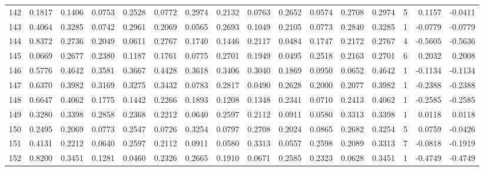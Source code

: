 \begin{tabular}{lrrrrrrrrrrrrrrr}
142 &      0.1817 &  0.1406 &  0.0753 &  0.2528 &  0.0772 &  0.2974 &  0.2132 &  0.0763 &  0.2652 &  0.0574 &   0.2708 &     0.2974 &      5 &                    0.1157 &                    -0.0411 \\
143 &      0.4064 &  0.3285 &  0.0742 &  0.2961 &  0.2069 &  0.0565 &  0.2693 &  0.1049 &  0.2105 &  0.0773 &   0.2840 &     0.3285 &      1 &                   -0.0779 &                    -0.0779 \\
144 &      0.8372 &  0.2736 &  0.2049 &  0.0611 &  0.2767 &  0.1740 &  0.1446 &  0.2117 &  0.0484 &  0.1747 &   0.2172 &     0.2767 &      4 &                   -0.5605 &                    -0.5636 \\
145 &      0.0669 &  0.2677 &  0.2380 &  0.1187 &  0.1761 &  0.0775 &  0.2701 &  0.1949 &  0.0495 &  0.2518 &   0.2163 &     0.2701 &      6 &                    0.2032 &                     0.2008 \\
146 &      0.5776 &  0.4642 &  0.3581 &  0.3667 &  0.4428 &  0.3618 &  0.3406 &  0.3040 &  0.1869 &  0.0950 &   0.0652 &     0.4642 &      1 &                   -0.1134 &                    -0.1134 \\
147 &      0.6370 &  0.3982 &  0.3169 &  0.3275 &  0.3432 &  0.0783 &  0.2817 &  0.0490 &  0.2628 &  0.2000 &   0.2077 &     0.3982 &      1 &                   -0.2388 &                    -0.2388 \\
148 &      0.6647 &  0.4062 &  0.1775 &  0.1442 &  0.2266 &  0.1893 &  0.1208 &  0.1348 &  0.2341 &  0.0710 &   0.2413 &     0.4062 &      1 &                   -0.2585 &                    -0.2585 \\
149 &      0.3280 &  0.3398 &  0.2858 &  0.2368 &  0.2212 &  0.0640 &  0.2597 &  0.2112 &  0.0911 &  0.0580 &   0.3313 &     0.3398 &      1 &                    0.0118 &                     0.0118 \\
150 &      0.2495 &  0.2069 &  0.0773 &  0.2547 &  0.0726 &  0.3254 &  0.0797 &  0.2708 &  0.2024 &  0.0865 &   0.2682 &     0.3254 &      5 &                    0.0759 &                    -0.0426 \\
151 &      0.4131 &  0.2212 &  0.0640 &  0.2597 &  0.2112 &  0.0911 &  0.0580 &  0.3313 &  0.0557 &  0.2598 &   0.2089 &     0.3313 &      7 &                   -0.0818 &                    -0.1919 \\
152 &      0.8200 &  0.3451 &  0.1281 &  0.0460 &  0.2326 &  0.2665 &  0.1910 &  0.0671 &  0.2585 &  0.2323 &   0.0628 &     0.3451 &      1 &                   -0.4749 &                    -0.4749 \\

\end{tabular}
